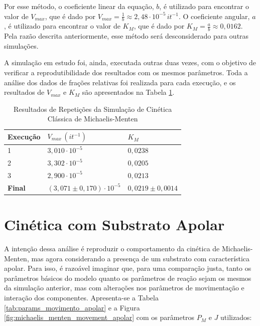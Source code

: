 \documentclass[12pt,oneside]{report}
\begin{document}
Por esse método, o coeficiente linear da equação, $b$, é utilizado para encontrar o valor de $V_{max}$, que é dado por $V_{max} = \frac{1}{b} \approx 2{,}48 \cdot 10^{-5} \, it^{-1}$. O coeficiente angular, $a$, é utilizado para encontrar o valor de $K_M$, que é dado por $K_M = \frac{a}{b} \approx 0{,}0162$. Pela razão descrita anteriormente, esse método será desconsiderado para outras simulações.

A simulação em estudo foi, ainda, executada outras duas vezes, com o objetivo de verificar a reprodutibilidade dos resultados com os mesmos parâmetros. Toda a análise dos dados de frações relativas foi realizada para cada execução, e os resultados de $V_{max}$ e $K_M$ são apresentados na Tabela \ref{tab:params_MM_repeticoes}.

\begin{table}[H]
    \centering
    \caption{Resultados de Repetições da Simulação de Cinética Clássica de Michaelis-Menten}
    \vspace{0.2cm}
    \begin{tabularx}{\textwidth}{X X m{5cm}}
        \hline
        \textbf{Execução} & \textbf{$V_{max} \, (it^{-1})$ }      & \textbf{$K_M$}          \\
        \hline
        1                 & $3{,}010 \cdot 10^{-5}$               & $0{,}0238$              \\
        2                 & $3{,}302 \cdot 10^{-5}$               & $0{,}0205$              \\
        3                 & $2{,}900 \cdot 10^{-5}$               & $0{,}0213$              \\
        \hline
        \textbf{Final}    & $(3{,}071 \pm 0{,}170) \cdot 10^{-5}$ & $0{,}0219 \pm 0{,}0014$ \\
        \hline
    \end{tabularx}
    \vspace{0.2cm}
    \label{tab:params_MM_repeticoes}
\end{table}

\section{Cinética com Substrato Apolar}

A intenção dessa análise é reproduzir o comportamento da cinética de Michaelis-Menten, mas agora considerando a presença de um substrato com característica apolar. Para isso, é razoável imaginar que, para uma comparação justa, tanto os parâmetros básicos do modelo quanto os parâmetros de reação sejam os mesmos da simulação anterior, mas com alterações nos parâmetros de movimentação e interação dos componentes. Apresenta-se a Tabela \ref{tab:params_movimento_apolar} e a Figura \ref{fig:michaelis_menten_movement_apolar} com os parâmetros $P_M$ e $J$ utilizados:
\end{document}
